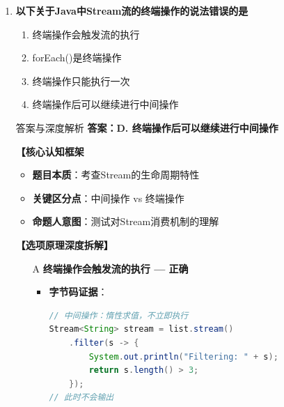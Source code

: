 \documentclass[12pt, a4paper]{ctexart}
\begin{document}
\begin{enumerate}[label=\textbf{\arabic*.}]
\begin{bluebox}{答案与深度解析}
		      \textbf{【应背诵知识点}
		      \begin{itemize}[label={}, nosep]
			      \item Collection.stream()：从创建Stream
			      \item Stream.of()：从值创建Stream
			      \item Arrays.stream()：从数组创建Stream
			      \item Stream.generate()：生成无限Stream
			      \item parallelStream()：创建并行Stream
		      \end{itemize}

		      \textbf{【命题趋势与实战策略】}

		      \textbf{考场秒杀}：看到"创建Stream流"→选stream()或Stream.of()
	      \end{bluebox}

	      \vspace{1em}

	\item \textbf{以下关于Java中Stream流的终端操作的说法错误的是}
	      \begin{enumerate}[label=\Alph*.]
		      \item 终端操作会触发流的执行
		      \item forEach()是终端操作
		      \item 终端操作只能执行一次
		      \item 终端操作后可以继续进行中间操作
	      \end{enumerate}

	      \begin{bluebox}{答案与深度解析}
		      \textbf{答案：D. 终端操作后可以继续进行中间操作}

		      \textbf{【核心认知框架}
		      \begin{itemize}[label={}, leftmargin=*, nosep]
			      \item \textbf{题目本质}：考查Stream的生命周期特性
			      \item \textbf{关键区分点}：中间操作 vs 终端操作
			      \item \textbf{命题人意图}：测试对Stream消费机制的理解
		      \end{itemize}

		      \textbf{【选项原理深度拆解】}

		      \begin{itemize}[leftmargin=*, nosep, label={}]
			      \item[A] \textbf{终端操作会触发流的执行 — 正确}
			            \begin{itemize}[label={}, leftmargin=*, nosep]
				            \item \textbf{字节码证据}：
				                  \begin{lstlisting}[language=Java]
// 中间操作：惰性求值，不立即执行
Stream<String> stream = list.stream()
    .filter(s -> {
        System.out.println("Filtering: " + s);
        return s.length() > 3;
    });
// 此时不会输出


\end{lstlisting}
\end{itemize}
\end{itemize}
\end{bluebox}
\end{enumerate}
\end{document}
